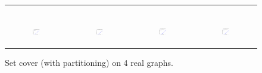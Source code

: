 \begin{figure}[ht]
\begin{tabular}{cccc}
\begin{subfigure}[b]{0.22\textwidth}
			\caption{}
			\label{appfig:partition:diffFA_CF2G_it2004_setcover}
	  \end{subfigure} \\
	  \begin{subfigure}[b]{0.22\textwidth}
	  	\includegraphics[width=110pt]{images_partition/validated_CC2G_friendster_setcover.pdf}
			\caption{}
			\label{appfig:partition:validated_CC2G_friendster_setcover}
	  \end{subfigure} &
	  \begin{subfigure}[b]{0.22\textwidth}
	  	\includegraphics[width=110pt]{images_partition/validated_CC2G_arabic2005_setcover.pdf}
			\caption{}
			\label{appfig:partition:validated_CC2G_arabic2005_setcover}
	  \end{subfigure} &
	  \begin{subfigure}[b]{0.22\textwidth}
	  	\includegraphics[width=110pt]{images_partition/validated_CC2G_uk2005_setcover.pdf}
			\caption{}
			\label{appfig:partition:validated_CC2G_uk2005_setcover}
	  \end{subfigure} &
	  \begin{subfigure}[b]{0.22\textwidth}
	  	\includegraphics[width=110pt]{images_partition/validated_CC2G_it2004_setcover.pdf}
			\caption{}
			\label{appfig:partition:validated_CC2G_it2004_setcover}
	  \end{subfigure} \\
  \end{tabular}
  \caption{Set cover (with partitioning) on 4 real graphs.}
\end{figure}



